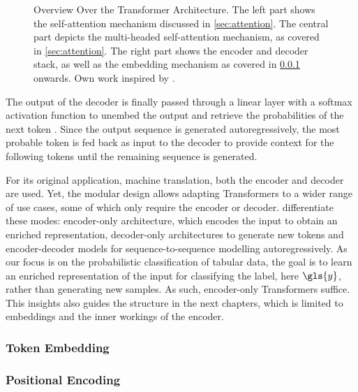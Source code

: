 \begin{landscape}
\begin{figure}[ht]
\centering
{\renewcommand\normalsize{\scriptsize}%
\normalsize
}
\caption[Overview Over the Transformer Architecture]{Overview Over the Transformer Architecture. The left part shows the self-attention mechanism discussed in \cref{sec:attention}. The central part depicts the multi-headed self-attention mechanism, as covered in \cref{sec:attention}. The right part shows the encoder and decoder stack, as well as the \gls{embedding} mechanism as covered in \cref{sec:token-embeddings} onwards. Own work inspired by \textcite[][3]{tayEfficientTransformersSurvey2022}.}
\label{fig:transformer-architecture-overview}
\end{figure}
\end{landscape}
The output of the decoder is finally passed through a linear layer with a softmax activation function to unembed the output and retrieve the probabilities of the next \gls{token} \autocite[][5]{vaswaniAttentionAllYou2017}. Since the output sequence is generated autoregressively, the most probable \gls{token} is fed back as input to the decoder to provide context for the following \glspl{token} until the remaining sequence is generated.

For its original application, machine translation, both the encoder and decoder are used. Yet, the modular design allows adapting Transformers to a wider range of use cases, some of which only require the encoder or decoder. \textcite[][16--17]{raffelExploringLimitsTransfer2020} differentiate these modes: encoder-only architecture, which encodes the input to obtain an enriched representation, decoder-only architectures to generate new \glspl{token} and encoder-decoder models for sequence-to-sequence modelling autoregressively. As our focus is on the probabilistic classification of tabular data, the goal is to learn an enriched representation of the input for classifying the label, here $\gls{y}$, rather than generating new samples. As such, encoder-only Transformers suffice. This insights also guides the structure in the next chapters, which is limited to \glspl{embedding} and the inner workings of the encoder.

\subsubsection{Token Embedding}\label{sec:token-embeddings}


\subsubsection{Positional Encoding}\label{sec:positional-encoding}

